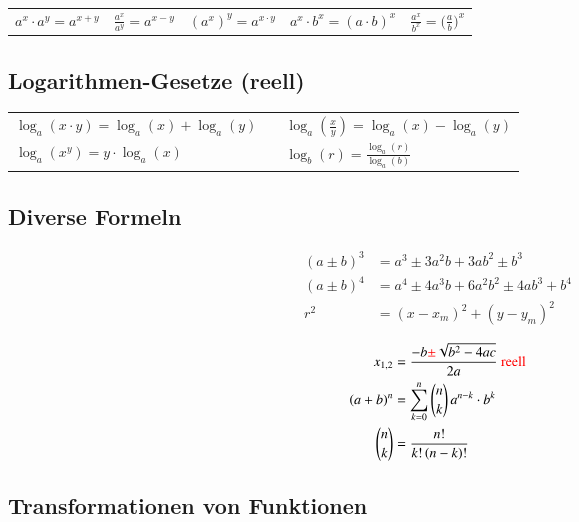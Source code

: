\begin{tabular}{lllll}
    $a^x \cdot a^y = a^{x + y}$ & $\frac{a^x}{a^y} = a^{x-y}$ & $(a^x)^y = a^{x \cdot y}$ & $a^x \cdot b^x = (a \cdot b)^x$ & $\frac{a^x}{b^x} = \big( \frac{a}{b} \big) ^x$
\end{tabular}


\subsection{Logarithmen-Gesetze (reell)}

\renewcommand{\arraystretch}{1.5}
\begin{tabular}{lll}
    $\log_a(x \cdot y) = \log_a(x) + \log_a(y)$ &  & $\log_a(\frac{x}{y}) = \log_a(x) - \log_a(y)$ \\

    $\log_a(x^y) = y \cdot \log_a(x)$           &  & $\log_b(r) = \frac{\log_a(r)}{\log_a(b)}$
\end{tabular}
\renewcommand{\arraystretch}{1}


\subsection{Diverse Formeln}

\vspace{-0.5cm}

\begin{minipage}[t]{0.55\columnwidth}
    \begin{align*}
        (a \pm b)^3 & = a^3 \pm 3a^2b + 3ab^2 \pm b^3           \\
        (a \pm b)^4 & = a^4 \pm 4a^3b + 6a^2b^2 \pm 4ab^3 + b^4 \\
        r^2         & = (x - x_m)^2 + (y - y_m)^2
    \end{align*}
\end{minipage}
\hfill
\begin{minipage}[t]{0.43\columnwidth}
    \begin{align*}
        x_{1,2}            & = \frac{-b {\color{red}\pm} \sqrt{b^2 - 4ac}}{2a} \text{ {\color{red}reell}} \\
        \left(a+b\right)^n & = \sum\limits_{k=0}^n \binom{n}{k} \, a^{n-k} \cdot b^k        \\
        \binom{n}{k}       & = \frac{n!}{k!\left(n-k\right)!}
    \end{align*}
\end{minipage}


\subsection{Transformationen von Funktionen}

